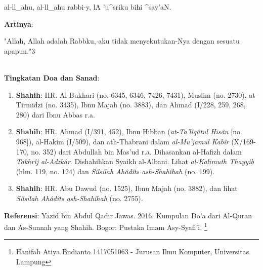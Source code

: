 \documentclass[a4paper,12pt]{article}
\begin{document}
\begin{arabtext}
\noindent
al-ll_ahu, al-ll_ahu rabbi-y, lA 'u^sriku bihi ^say'aN.\\
\end{arabtext}
\noindent
\textbf{Artinya}:
\par
\indent
"Allah, Allah  adalah Rabbku, aku tidak menyekutukan-Nya dengan sesuatu 
apapun."{\scriptsize 3}\\\\
\par
\noindent
\textbf{Tingkatan Doa dan Sanad}:
\begin{enumerate}
\item \textbf{Shahih}: HR. Al-Bukhari (no. 6345, 6346, 7426, 7431), Muslim 
(no. 2730), at-Tirmidzi (no. 3435), Ibnu Majah (no. 3883), dan Ahmad 
(I/228, 259, 268, 280) dari Ibnu Abbas r.a.
\item \textbf{Shahih}: HR. Ahmad (I/391, 452), Ibnu Hibban 
(\textit{at-Ta'l\^{i}q\^{a}tul His\^{a}n} [no. 968]), al-Hakim (I/509), dan
ath-Thabrani dalam \textit{al-Mu'jamul Kab\^{i}r} (X/169-170, no. 352) dari
Abdullah bin Mas'ud r.a. Dihasankan al-Hafizh dalam \textit{Takhr\^{i}j 
al-Adzk\^{a}r}. Dishahihkan Syaikh al-Albani. Lihat \textit{al-Kalimuth 
Thayyib} (hlm. 119, no. 124) dan \textit{Silsilah Ah\^{a}d\^{i}ts 
ash-Shah\^{i}hah} (no. 199).
\item \textbf{Shahih}: HR. Abu Dawud (no. 1525), Ibnu Majah (no. 3882), dan
lihat \textit{Silsilah Ah\^{a}d\^{i}ts ash-Shah\^{i}hah} (no. 2755).
\end{enumerate}
\textbf{Referensi}: Yazid bin Abdul Qadir Jawas. 2016. Kumpulan Do'a dari
Al-Quran dan As-Sunnah yang Shahih. Bogor: Pustaka Imam Asy-Syafi'i.
\footnote{Hanifah Atiya Budianto 1417051063 - Jurusan Ilmu Komputer,
Universitas Lampung}
\end{document}
